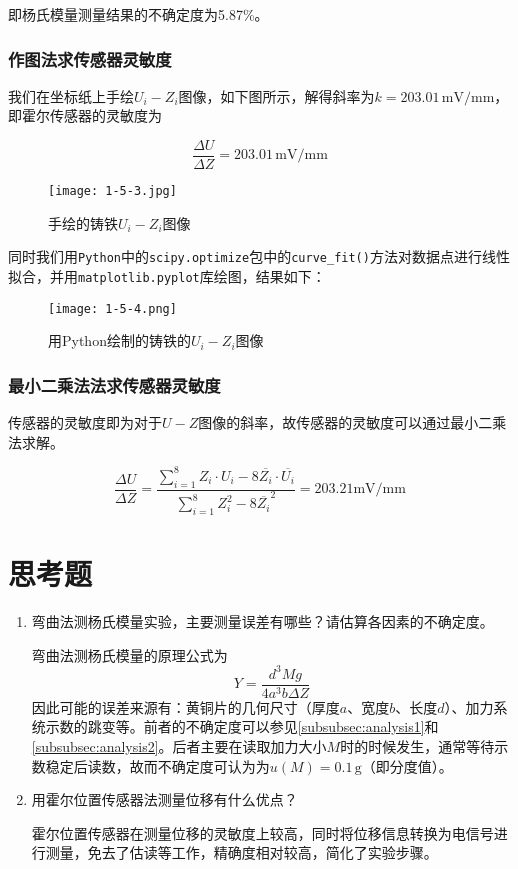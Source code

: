 \documentclass[12pt]{article}
\begin{document}
即杨氏模量测量结果的不确定度为5.87\%。

\subsubsection{作图法求传感器灵敏度}

我们在坐标纸上手绘$U_i-Z_i$图像，如下图所示，解得斜率为$k=203.01\,\mathrm{mV/mm}$，即霍尔传感器的灵敏度为

\[
    \frac{\Delta U}{\Delta Z}=203.01\,\mathrm{mV/mm}
\]

\begin{figure}[htbp]
    \centering
    \texttt{[image: 1-5-3.jpg]}
    \caption{手绘的铸铁$U_i-Z_i$图像}
\end{figure}

同时我们用\verb|Python|中的\verb|scipy.optimize|包中的\verb|curve_fit()|方法对数据点进行线性拟合，并用\verb|matplotlib.pyplot|库绘图，结果如下：

\begin{figure}[h!]
    \centering
    \texttt{[image: 1-5-4.png]}
    \caption{用Python绘制的铸铁的$U_i-Z_i$图像}
\end{figure}

\subsubsection{最小二乘法法求传感器灵敏度}
传感器的灵敏度即为对于$U-Z$图像的斜率，故传感器的灵敏度可以通过最小二乘法求解。

\[
    \frac{\Delta U}{\Delta Z}=\dfrac{\sum_{i=1}^{8}Z_i \cdot U_i-8\overline{Z_i}\cdot\overline{U_i}}{\sum_{i=1}^{8}Z_i^2-8\overline{Z_i}^2}=203.21\mathrm{mV/mm}
\]

\section{思考题}
\begin{enumerate}
    \item {\kaishu 弯曲法测杨氏模量实验，主要测量误差有哪些？请估算各因素的不确定度。}
    
    弯曲法测杨氏模量的原理公式为
    \[
        Y=\frac{d^3Mg}{4a^3b\Delta Z}
    \]
    因此可能的误差来源有：黄铜片的几何尺寸（厚度$ a $、宽度$ b $、长度$ d $）、加力系统示数的跳变等。前者的不确定度可以参见\ref{subsubsec:analysis1}和\ref{subsubsec:analysis2}。后者主要在读取加力大小$M$时的时候发生，通常等待示数稳定后读数，故而不确定度可认为为$ u(M)=0.1\,\mathrm g $（即分度值）。
    \item {\kaishu 用霍尔位置传感器法测量位移有什么优点？}
    
    霍尔位置传感器在测量位移的灵敏度上较高，同时将位移信息转换为电信号进行测量，免去了估读等工作，精确度相对较高，简化了实验步骤。
\end{enumerate}
\end{document}
